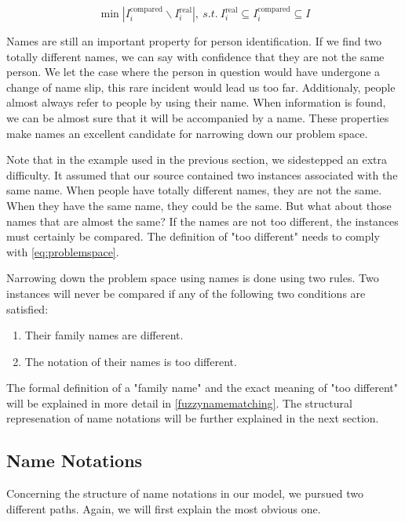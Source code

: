 \begin{equation}
\min |I^\text{compared}_i\backslash I^\text{real}_i|,\ s.t.\ I^\text{real}_i \subseteq I^\text{compared}_i \subseteq I
\label{eq:problemspace}
\end{equation}

Names are still an important property for person identification. If we find two totally different names, we can say with confidence that they are not the same person. We let the case where the person in question would have undergone a change of name slip, this rare incident would lead us too far. Additionaly, people almost always refer to people by using their name. When information is found, we can be almost sure that it will be accompanied by a name. These properties make names an excellent candidate for narrowing down our problem space.

Note that in the example used in the previous section, we sidestepped an extra difficulty. It assumed that our source contained two instances associated with the same name. When people have totally different names, they are not the same. When they have the same name, they could be the same. But what about those names that are almost the same? If the names are not too different, the instances must certainly be compared. The definition of "too different" needs to comply with \autoref{eq:problemspace}.

Narrowing down the problem space using names is done using two rules. Two instances will never be compared if any of the following two conditions are satisfied:

\begin{enumerate}
\item Their family names are different.
\item The notation of their names is too different.
\end{enumerate}

The formal definition of a "family name" and the exact meaning of "too different" will be explained in more detail in \autoref{fuzzynamematching}. The structural represenation of name notations will be further explained in the next section.

\subsection{Name Notations}

Concerning the structure of name notations in our model, we pursued two different paths. Again, we will first explain the most obvious one. 

